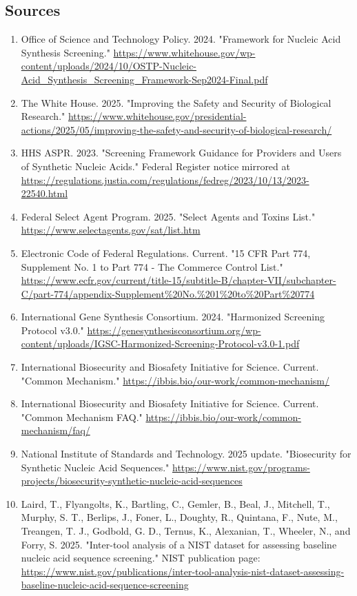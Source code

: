 \documentclass[11pt]{report}
\begin{document}
\subsection{Sources}
\begin{enumerate}
\item Office of Science and Technology Policy. 2024. "Framework for Nucleic Acid Synthesis Screening." \url{https://www.whitehouse.gov/wp-content/uploads/2024/10/OSTP-Nucleic-Acid_Synthesis_Screening_Framework-Sep2024-Final.pdf}
\item The White House. 2025. "Improving the Safety and Security of Biological Research." \url{https://www.whitehouse.gov/presidential-actions/2025/05/improving-the-safety-and-security-of-biological-research/}
\item HHS ASPR. 2023. "Screening Framework Guidance for Providers and Users of Synthetic Nucleic Acids." Federal Register notice mirrored at \url{https://regulations.justia.com/regulations/fedreg/2023/10/13/2023-22540.html}
\item Federal Select Agent Program. 2025. "Select Agents and Toxins List." \url{https://www.selectagents.gov/sat/list.htm}
\item Electronic Code of Federal Regulations. Current. "15 CFR Part 774, Supplement No. 1 to Part 774 - The Commerce Control List." \url{https://www.ecfr.gov/current/title-15/subtitle-B/chapter-VII/subchapter-C/part-774/appendix-Supplement\%20No.\%201\%20to\%20Part\%20774}
\item International Gene Synthesis Consortium. 2024. "Harmonized Screening Protocol v3.0." \url{https://genesynthesisconsortium.org/wp-content/uploads/IGSC-Harmonized-Screening-Protocol-v3.0-1.pdf}
\item International Biosecurity and Biosafety Initiative for Science. Current. "Common Mechanism." \url{https://ibbis.bio/our-work/common-mechanism/}
\item International Biosecurity and Biosafety Initiative for Science. Current. "Common Mechanism FAQ." \url{https://ibbis.bio/our-work/common-mechanism/faq/}
\item National Institute of Standards and Technology. 2025 update. "Biosecurity for Synthetic Nucleic Acid Sequences." \url{https://www.nist.gov/programs-projects/biosecurity-synthetic-nucleic-acid-sequences}
\item Laird, T., Flyangolts, K., Bartling, C., Gemler, B., Beal, J., Mitchell, T., Murphy, S. T., Berlips, J., Foner, L., Doughty, R., Quintana, F., Nute, M., Treangen, T. J., Godbold, G. D., Ternus, K., Alexanian, T., Wheeler, N., and Forry, S. 2025. "Inter-tool analysis of a NIST dataset for assessing baseline nucleic acid sequence screening." NIST publication page: \url{https://www.nist.gov/publications/inter-tool-analysis-nist-dataset-assessing-baseline-nucleic-acid-sequence-screening}

\end{enumerate}
\end{document}
